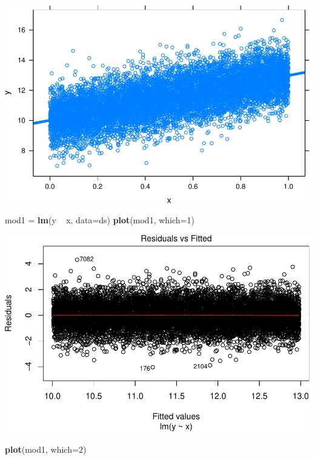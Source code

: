 \documentclass[]{article}
\newenvironment{Shaded}{\begin{snugshade}}{\end{snugshade}}
\newcommand{\KeywordTok}[1]{\textcolor[rgb]{0.13,0.29,0.53}{\textbf{{#1}}}}
\newcommand{\DataTypeTok}[1]{\textcolor[rgb]{0.13,0.29,0.53}{{#1}}}
\newcommand{\DecValTok}[1]{\textcolor[rgb]{0.00,0.00,0.81}{{#1}}}
\newcommand{\StringTok}[1]{\textcolor[rgb]{0.31,0.60,0.02}{{#1}}}
\newcommand{\NormalTok}[1]{{#1}}
\begin{document}
\includegraphics{02_lab_residuals_files/figure-latex/unnamed-chunk-11-1.pdf}

\begin{Shaded}
\begin{Highlighting}[]
\NormalTok{mod1 =}\StringTok{ }\KeywordTok{lm}\NormalTok{(y ~}\StringTok{ }\NormalTok{x, }\DataTypeTok{data=}\NormalTok{ds)}
\KeywordTok{plot}\NormalTok{(mod1, }\DataTypeTok{which=}\DecValTok{1}\NormalTok{)}
\end{Highlighting}
\end{Shaded}

\includegraphics{02_lab_residuals_files/figure-latex/unnamed-chunk-11-2.pdf}

\begin{Shaded}
\begin{Highlighting}[]
\KeywordTok{plot}\NormalTok{(mod1, }\DataTypeTok{which=}\DecValTok{2}\NormalTok{)}
\end{Highlighting}
\end{Shaded}
\end{document}

